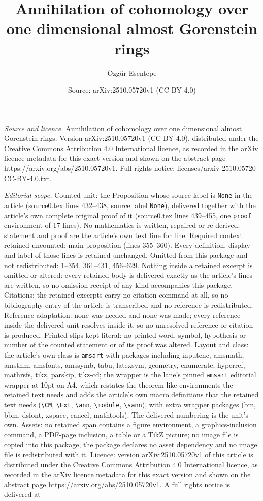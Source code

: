 \documentclass[10pt,a4paper]{amsart}
\title[Annihilation of cohomology over one dimensional almost Goren]{Annihilation of cohomology over one dimensional almost Gorenstein rings}
\author{\"Ozg\"ur Esentepe}
\date{Source: arXiv:2510.05720v1 (CC BY 4.0)}
\begin{document}
\maketitle

\noindent\emph{Source and licence.} Annihilation of cohomology over one dimensional almost Gorenstein rings. Version arXiv:2510.05720v1 (CC BY 4.0), distributed under the Creative Commons Attribution 4.0 International licence, as recorded in the arXiv licence metadata for this exact version and shown on the abstract page https://arxiv.org/abs/2510.05720v1. Full rights notice: licenses/arxiv-2510.05720-CC-BY-4.0.txt.\par\smallskip

\noindent\textit{Editorial scope.} Counted unit: the Proposition whose source label is \texttt{None} in the article (source0.tex lines 432--438, source label \texttt{None}), delivered together with the article's own complete original proof of it (source0.tex lines 439--455, one \texttt{proof} environment of 17 lines). No mathematics is written, repaired or re-derived: statement and proof are the article's own text line for line. Required context retained uncounted: main-proposition (lines 355--360). Every definition, display and label of those lines is retained unchanged. Omitted from this package and not redistributed: 1--354, 361--431, 456--629. Nothing inside a retained excerpt is omitted or altered: every retained body is delivered exactly as the article's lines are written, so no omission receipt of any kind accompanies this package. Citations: the retained excerpts carry no citation command at all, so no bibliography entry of the article is transcribed and no reference is redistributed. Reference adaptation: none was needed and none was made; every reference inside the delivered unit resolves inside it, so no unresolved reference or citation is produced. Printed slips kept literal: no printed word, symbol, hypothesis or number of the counted statement or of its proof was altered. Layout and class: the article's own class is \texttt{amsart} with packages including inputenc, amsmath, amsthm, amsfonts, amssymb, tabu, latexsym, geometry, enumerate, hyperref, mathrsfs, tikz, parskip, tikz-cd; the wrapper is the lane's pinned \texttt{amsart} editorial wrapper at 10pt on A4, which restates the theorem-like environments the retained text needs and adds the article's own macro definitions that the retained text needs (\texttt{\textbackslash CM}, \texttt{\textbackslash Ext}, \texttt{\textbackslash ann}, \texttt{\textbackslash module}, \texttt{\textbackslash sann}), with extra wrapper packages (bm, bbm, dsfont, xspace, cancel, mathtools). The delivered numbering is the unit's own. Assets: no retained span contains a figure environment, a graphics-inclusion command, a PDF-page inclusion, a table or a TikZ picture; no image file is copied into this package, the package declares no asset dependency and no image file is redistributed with it. Licence: version arXiv:2510.05720v1 of this article is distributed under the Creative Commons Attribution 4.0 International licence, as recorded in the arXiv licence metadata for this exact version and shown on the abstract page https://arxiv.org/abs/2510.05720v1. A full rights notice is delivered at 
\end{document}
